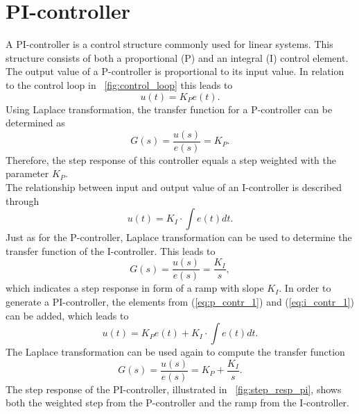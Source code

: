 \section{PI-controller}
A PI-controller is a control structure commonly used for linear systems. This structure consists of both a proportional (P) and an integral (I) control element.
The output value of a P-controller is proportional to its input value. In relation to the control loop in \figurename~\ref{fig:control_loop} this leads to
\begin{equation}
    u(t) = K_{P}e(t).
 \label{eq:p_contr_1}
\end{equation}
Using Laplace transformation, the transfer function for a P-controller can be determined as
\begin{equation}
    G(s) = \frac{u(s)}{e(s)} = K_{P}.
 \label{eq:p_contr_2}
\end{equation}
Therefore, the step response of this controller equals a step weighted with the parameter $K_{P}$.
\\The relationship between input and output value of an I-controller is described through
\begin{equation}
    u(t) = K_{I}\cdot\int e(t) dt.
 \label{eq:i_contr_1}
\end{equation}
Just as for the P-controller, Laplace transformation can be used to determine the transfer function of the I-controller.
This leads to
\begin{equation}
    G(s) = \frac{u(s)}{e(s)} = \frac{K_{I}}{s},
 \label{eq:i_contr_2}
\end{equation}
which indicates a step response in form of a ramp with slope $K_{I}$.
In order to generate a PI-controller, the elements from (\ref{eq:p_contr_1}) and (\ref{eq:i_contr_1}) can be added, which leads to
\begin{equation}
    u(t) = K_{P}e(t) + K_{I}\cdot\int e(t) dt.
 \label{eq:pi_contr_1}
\end{equation}
The Laplace transformation can be used again to compute the transfer function
\begin{equation}
    G(s) = \frac{u(s)}{e(s)} =  K_{P} + \frac{K_{I}}{s}.
 \label{eq:pi_contr_2}
\end{equation}
The step response of the PI-controller, illustrated in \figurename~\ref{fig:step_resp_pi}, shows both the weighted step from the P-controller and the ramp from the I-controller.

